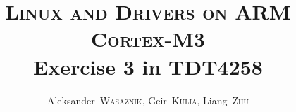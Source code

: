 \documentclass[a4,journal,twoside]{IEEEtran}
\title{
    \textsc{Linux and Drivers on ARM Cortex-M3}\\
    Exercise 3 in TDT4258
}
\author{
    Aleksander~\textsc{Wasaznik},
    Geir~\textsc{Kulia},
    Liang~\textsc{Zhu}
}
\begin{document}
\maketitle

\begin{abstract}

\end{abstract}




\end{document}
